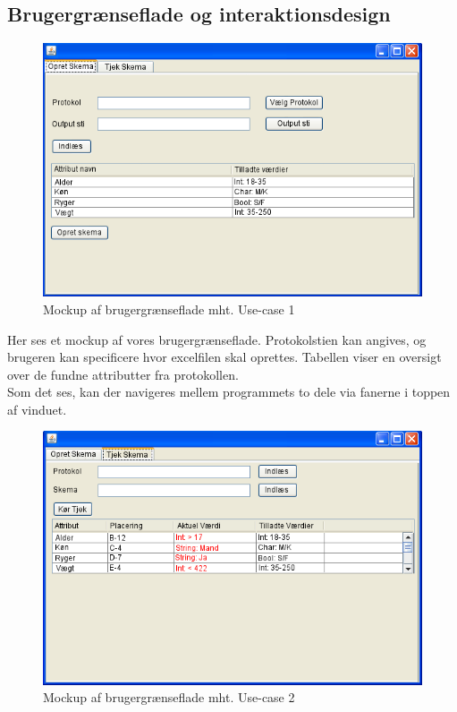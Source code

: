 \documentclass[11pt]{article}
\begin{document}
\subsection{Brugergrænseflade og interaktionsdesign}
\begin{figure}[H]
\includegraphics[scale=1]{osm.png}
\caption{Mockup af brugergrænseflade mht. Use-case 1}
\end{figure}
Her ses et mockup af vores brugergrænseflade. Protokolstien kan angives, og brugeren kan specificere hvor excelfilen skal oprettes. Tabellen viser en oversigt over de fundne attributter fra protokollen.\\
Som det ses, kan der navigeres mellem programmets to dele via fanerne i toppen af vinduet.
\begin{figure}[H]
\includegraphics[scale=0.8]{mockup2.png}
\caption{Mockup af brugergrænseflade mht. Use-case 2}
\end{figure}
\end{document}
